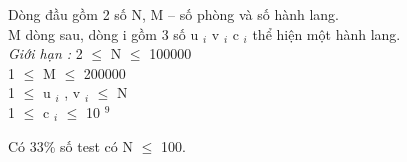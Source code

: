 Dòng đầu gồm 2 số N, M – số phòng và số hành lang.   
\\   M dòng sau, dòng i gồm 3 số u   $_    i   $   v   $_    i   $   c   $_    i   $   thể hiện một hành lang.   
\\\emph{    Giới hạn :   }   2  $\le$  N  $\le$  100000   
\\   1  $\le$  M  $\le$  200000   
\\   1  $\le$  u   $_    i   $   , v   $_    i   $    $\le$  N   
\\   1  $\le$  c   $_    i   $    $\le$  10   $^    9   $

   Có 33\% số test có N  $\le$  100.